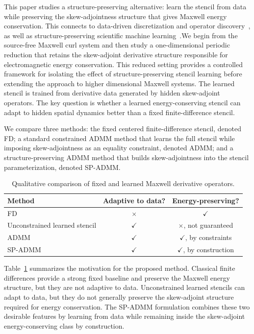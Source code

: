 \documentclass[11pt]{article}
\numberwithin{equation}{section}
\numberwithin{figure}{section}
\numberwithin{table}{section}
\begin{document}
This paper studies a structure-preserving alternative: learn the stencil from
data while preserving the skew-adjointness structure that gives Maxwell energy
conservation. This connects to data-driven discretization and operator
discovery~\cite{barsinai2019,brunton2016discovering}, as well as structure-preserving
scientific machine learning~\cite{obieke2025structurepreservingphysicsinformedneuralnetwork}.We begin from the source-free Maxwell curl system and then study a
one-dimensional periodic reduction that retains the skew-adjoint derivative
structure responsible for electromagnetic energy conservation. This reduced
setting provides a controlled framework for isolating the effect of
structure-preserving stencil learning before extending the approach to higher
dimensional Maxwell systems. The learned stencil is trained from derivative data generated by
hidden skew-adjoint operators. The key question is whether a learned
energy-conserving stencil can adapt to hidden spatial dynamics better than a
fixed finite-difference stencil.


We compare three methods: the fixed centered finite-difference stencil,
denoted FD; a standard constrained ADMM method that learns the full stencil
while imposing skew-adjointness as an equality constraint, denoted ADMM; and
a structure-preserving ADMM method that builds skew-adjointness into the
stencil parameterization, denoted SP-ADMM.

\begin{table}[htbp]
\centering
\caption{Qualitative comparison of fixed and learned Maxwell derivative operators.}
\label{tab:method-comparison}
\begin{tabular}{lcc}
\toprule
\textbf{Method} & \textbf{Adaptive to data?} & \textbf{Energy-preserving?} \\
\midrule
FD & \(\times\) & \(\checkmark\) \\
Unconstrained learned stencil & \(\checkmark\) & \(\times\), not guaranteed \\
ADMM & \(\checkmark\) & \(\checkmark\), by constraints \\
SP-ADMM & \(\checkmark\) & \(\checkmark\), by construction \\
\bottomrule
\end{tabular}
\end{table}

Table~\ref{tab:method-comparison} summarizes the motivation for the proposed
method. Classical finite differences provide a strong fixed baseline and
preserve the Maxwell energy structure, but they are not adaptive to data.
Unconstrained learned stencils can adapt to data, but they do not generally
preserve the skew-adjoint structure required for energy conservation. The
SP-ADMM formulation combines these two desirable features by learning from
data while remaining inside the skew-adjoint energy-conserving class by
construction.
\end{document}
